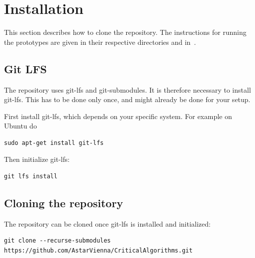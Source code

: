 \documentclass[11pt,oneside,a4paper]{article}
\begin{document}
\section{Installation}
\label{sec:installation}
This section describes how to clone the repository.
The instructions for running the prototypes are given in their respective directories and in~\cite{DRLD}.

\subsection{Git LFS}
\label{ssec:gitlfs}
The repository uses git-lfs and git-submodules.
It is therefore necessary to install git-lfs.
This has to be done only once, and might already be done for your setup.

First install git-lfs, which depends on your specific system.
For example on Ubuntu do
\begin{lstlisting}
sudo apt-get install git-lfs
\end{lstlisting}

Then initialize git-lfs:
\begin{lstlisting}
git lfs install
\end{lstlisting}

\subsection{Cloning the repository}
\label{ssec:cloning}

The repository can be cloned once git-lfs is installed and initialized:

\begin{lstlisting}
git clone --recurse-submodules https://github.com/AstarVienna/CriticalAlgorithms.git
\end{lstlisting}



%
\end{document}
